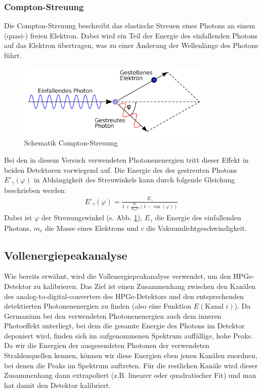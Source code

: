 \subsubsection{Compton-Streuung}

Die Compton-Streuung beschreibt das elastische Streuen eines Photons an einem (quasi-) freien Elektron. Dabei wird ein Teil der Energie des einfallenden Photons auf das Elektron übertragen, was zu einer Änderung der Wellenlänge des Photons führt.

\begin{figure}[ht]
	\centering
    \includegraphics[width=0.85\textwidth]{images/The-geometry-of-Compton-scattering-showing-the-directions-of-the-scattered-photon-and.png}
	\caption{Schematik Compton-Streuung \cite{Bild_Compton_Streuung}}
	\label{theorie_Compton_Streuuung}
\end{figure}

Bei den in diesem Versuch verwendeten Photonenenergien tritt dieser Effekt in beiden Detektoren vorwiegend auf.
Die Energie des des gestreuten Photons $E'_{\gamma}(\varphi)$ in Abhängigkeit des Streuwinkels kann durch folgende Gleichung beschrieben werden:
\begin{gather}
    E'_{\gamma}(\varphi) = \frac{E_{\gamma}}{1 + \frac{E_{\gamma}}{m_{e} c^{2}} (1 - \cos (\varphi))}
\end{gather}
Dabei ist $\varphi$ der Streuungswinkel (s. Abb. \ref{theorie_Compton_Streuuung}), $E_{\gamma}$ die Energie des einfallenden Photons, $m_{e}$ die Masse eines Elektrons und $c$ die Vakuumlichtgeschwindigkeit.

\subsection{Vollenergiepeakanalyse}

Wie bereits erwähnt, wird die Vollenergiepeakanalyse verwendet, um den HPGe-Detektor zu kalibrieren. Das Ziel ist einen Zusammenhang zwischen den Kanälen des analog-to-digital-converters des HPGe-Detektors und den entsprechenden detektierten Photonenenergien zu finden (also eine Funktion $E(\text{Kanal } i)$). Da Germanium bei den verwendeten Photonenenergien auch dem inneren Photoeffekt unterliegt, bei dem die gesamte Energie des Photons im Detektor deponiert wird, finden sich im aufgenommenen Spektrum auffällige, hohe Peaks. Da wir die Energien der ausgesendeten Photonen der verwendeten Strahlenquellen kennen, können wir diese Energien eben jenen Kanälen zuordnen, bei denen die Peaks im Spektrum auftreten. Für die restlichen Kanäle wird dieser Zusammenhang dann extrapoliert (z.B. linearer oder quadratischer Fit) und man hat damit den Detektor kalibriert.

